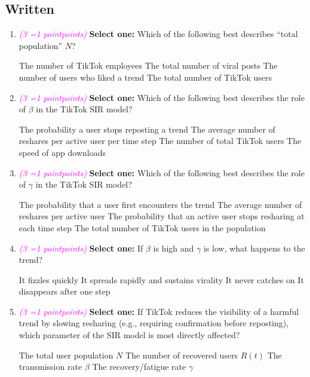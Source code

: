 \documentclass[11pt, letter, answers]{exam}
\newcommand{\grade}[1]{
    \small\textcolor{magenta}{\emph{(#1 \ifnum#1=1 point\else points\fi)}}%
    \normalsize
}
\newcommand{\sOne}{\textbf{Select one: }}
\begin{document}
\subsection{Written}
\begin{enumerate}[label=(\alph*)]

\item \grade{3} \sOne Which of the following best describes “total population” $N$?
\begin{checkboxes}
    \choice The number of TikTok employees
    \choice The total number of viral posts
    \choice The number of users who liked a trend
    \choice The total number of TikTok users
\end{checkboxes}


\item \grade{3} \sOne Which of the following best describes the role of $\beta$ in the TikTok SIR model?
\begin{checkboxes}
    \choice The probability a user stops reposting a trend
    \choice The average number of reshares per active user per time step
    \choice The number of total TikTok users
    \choice The speed of app downloads
\end{checkboxes}


\item \grade{3} \sOne Which of the following best describes the role of $\gamma$ in the TikTok SIR model?
\begin{checkboxes}
    \choice The probability that a user first encounters the trend
    \choice The average number of reshares per active user
    \choice The probability that an active user stops resharing at each time step
    \choice The total number of TikTok users in the population
\end{checkboxes}


\item \grade{3} \sOne If $\beta$ is high and $\gamma$ is low, what happens to the trend?
\begin{checkboxes}
    \choice It fizzles quickly
    \choice It spreads rapidly and sustains virality
    \choice It never catches on
    \choice It disappears after one step
\end{checkboxes}


\item \grade{3} \sOne If TikTok reduces the visibility of a harmful trend by slowing resharing (e.g., requiring confirmation before reposting), which parameter of the SIR model is most directly affected?
\begin{checkboxes}
    \choice The total user population $N$
    \choice The number of recovered users $R(t)$
    \choice The transmission rate $\beta$
    \choice The recovery/fatigue rate $\gamma$
\end{checkboxes}



\end{enumerate}
\end{document}
